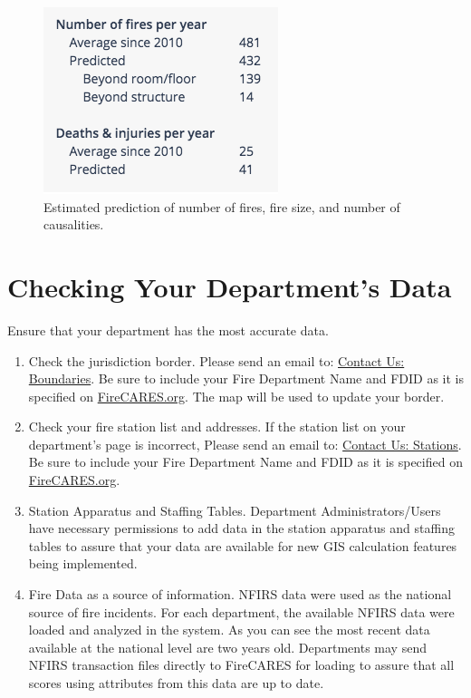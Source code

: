 \documentclass[12pt,oneside]{book}
\begin{document}
\begin{figure}[ht!]
\centering
\includegraphics[width=.5\columnwidth]{Figures/fire_predictions}
\caption{Estimated prediction of number of fires, fire size, and number of causalities.}
\label{fig:fire_predictions}
\end{figure}

\chapter{Checking Your Department's Data}

Ensure that your department has the most accurate data.

\begin{enumerate}
\item Check the jurisdiction border. Please send an email to: \href{mailto:boundaries@firecares.org}{Contact Us: Boundaries}. Be sure to include your Fire Department Name and FDID as it is specified on \href{https://www.FireCARES.org}{FireCARES.org}. The map will be used to update your border.

\item Check your fire station list and addresses. If the station list on your department's page is incorrect, Please send an email to: \href{mailto:stations@firecares.org}{Contact Us: Stations}. Be sure to include your Fire Department Name and FDID as it is specified on \href{https://www.FireCARES.org}{FireCARES.org}.

\item Station Apparatus and Staffing Tables. Department Administrators/Users have necessary permissions to add data in the station apparatus and staffing tables to assure that your data are available for new GIS calculation features being implemented. 

\item Fire Data as a source of information. NFIRS data were used as the national source of fire incidents. For each department, the available NFIRS data were loaded and analyzed in the system.  As you can see the most recent data available at the national level are two years old. Departments may send NFIRS transaction files directly to FireCARES for loading to assure that all scores using attributes from this data are up to date.  

\end{enumerate}
\end{document}
